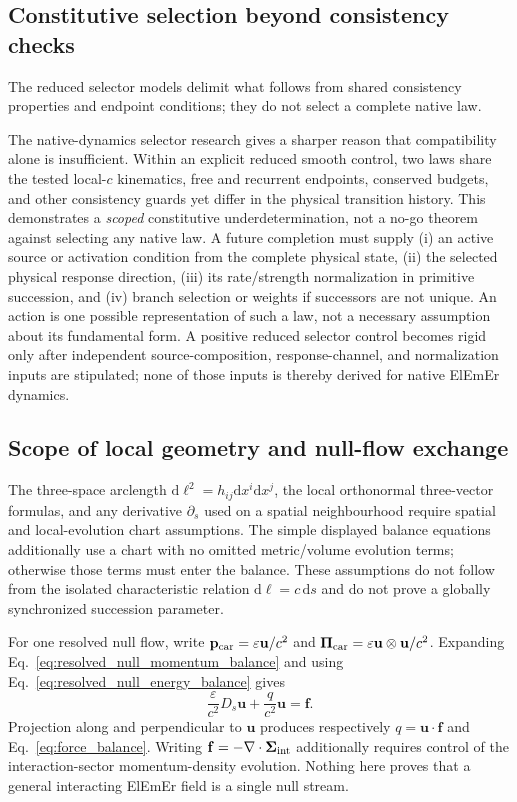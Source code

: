 \documentclass[11pt]{article}
\theoremstyle{definition}
\newcommand{\ElEmEr}{\mbox{ElEmEr}}
\newcommand{\dd}{\mathrm{d}}
\begin{document}
\subsection{Constitutive selection beyond consistency checks}
\label{subsec:selector-controls}
The reduced selector models delimit what follows from shared consistency
properties and endpoint conditions; they do not select a complete native law.

The native-dynamics selector research gives a sharper reason that compatibility
alone is insufficient.  Within an explicit reduced smooth control, two laws
share the tested local-$c$ kinematics, free and recurrent endpoints, conserved
budgets, and other consistency guards yet differ in the physical transition
history.  This demonstrates a \emph{scoped} constitutive underdetermination,
not a no-go theorem against selecting any native law.  A future completion must
supply (i) an active source or activation condition from the complete physical
state, (ii) the selected physical response direction, (iii) its rate/strength
normalization in primitive succession, and (iv) branch selection or weights if
successors are not unique.  An action is one possible representation of such
a law, not a necessary assumption about its fundamental form.  A positive
reduced selector control becomes rigid only after independent source-composition,
response-channel, and normalization inputs are stipulated; none of those inputs
is thereby derived for native \ElEmEr{} dynamics.

\subsection{Scope of local geometry and null-flow exchange}
\label{subsec:null-flow-proof}
The three-space arclength $\dd\ell^2=h_{ij}\dd x^i\dd x^j$, the local
orthonormal three-vector formulas, and any derivative $\partial_s$ used on a spatial
neighbourhood require spatial and local-evolution chart assumptions.  The
simple displayed balance equations additionally use a chart with no omitted
metric/volume evolution terms; otherwise those terms must enter the balance.
These assumptions do not
follow from the isolated characteristic relation $\dd\ell=c\,\dd s$ and do not
prove a globally synchronized succession parameter.

For one resolved null flow, write
$\mathbf p_{\rm car}=\varepsilon\mathbf u/c^2$ and
$\boldsymbol\Pi_{\rm car}=\varepsilon\mathbf u\otimes\mathbf u/c^2$.
Expanding Eq.~\eqref{eq:resolved_null_momentum_balance} and using
Eq.~\eqref{eq:resolved_null_energy_balance} gives
\begin{equation}
 \frac{\varepsilon}{c^2}D_s\mathbf u
 +\frac{q}{c^2}\mathbf u=\mathbf f.
\end{equation}
Projection along and perpendicular to $\mathbf u$ produces respectively
$q=\mathbf u\cdot\mathbf f$ and Eq.~\eqref{eq:force_balance}.  Writing
$\mathbf f=-\nabla\cdot\boldsymbol\Sigma_{\rm int}$ additionally requires
control of the interaction-sector momentum-density evolution.  Nothing here
proves that a general interacting ElEmEr field is a single null stream.
\end{document}
